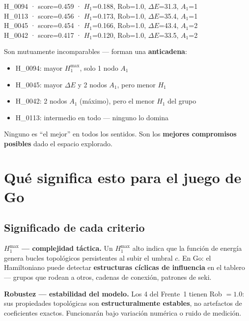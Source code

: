 \documentclass[11pt, a4paper]{article}
\begin{document}
\begin{tcolorbox}[codebox]
H\_0094 · score=0.459 · $H_1$=0.188, Rob=1.0, $\Delta E$=31.3, $A_1$=1\\
H\_0113 · score=0.456 · $H_1$=0.173, Rob=1.0, $\Delta E$=35.4, $A_1$=1\\
H\_0045 · score=0.454 · $H_1$=0.166, Rob=1.0, $\Delta E$=43.4, $A_1$=2\\
H\_0042 · score=0.417 · $H_1$=0.120, Rob=1.0, $\Delta E$=33.5, $A_1$=2
\end{tcolorbox}

Son mutuamente incomparables --- forman una \textbf{anticadena}:
\begin{itemize}
  \item H\_0094: mayor $H_1^{\max}$, solo 1 nodo $A_1$
  \item H\_0045: mayor $\Delta E$ y 2 nodos $A_1$, pero menor $H_1$
  \item H\_0042: 2 nodos $A_1$ (m\'aximo), pero el menor $H_1$ del grupo
  \item H\_0113: intermedio en todo --- ninguno lo domina
\end{itemize}

Ninguno es ``el mejor'' en todos los sentidos. Son los \textbf{mejores
compromisos posibles} dado el espacio explorado.

\section{Qu\'e significa esto para el juego de Go}

\subsection{Significado de cada criterio}

\textbf{$H_1^{\max}$ --- complejidad t\'actica.}
Un $H_1^{\max}$ alto indica que la funci\'on de energ\'ia genera bucles
topol\'ogicos persistentes al subir el umbral $c$. En Go: el Hamiltoniano
puede detectar \textbf{estructuras c\'iclicas de influencia} en el tablero
--- grupos que rodean a otros, cadenas de conexi\'on, patrones de seki.

\textbf{Robustez --- estabilidad del modelo.}
Los 4 del Frente~1 tienen Rob $=1.0$: sus propiedades topol\'ogicas son
\textbf{estructuralmente estables}, no artefactos de coeficientes exactos.
Funcionar\'an bajo variaci\'on num\'erica o ruido de medici\'on.
\end{document}
